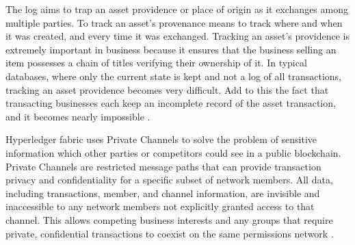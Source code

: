 The log aims to trap an asset providence or place of origin as it exchanges among multiple parties. To track an asset's provenance means to track where and when it was created, and every time it was exchanged. Tracking an asset's providence is extremely important in business because it ensures that the business selling an item possesses a chain of titles verifying their ownership of it. In typical databases, where only the current state is kept and not a log of all transactions, tracking an asset providence becomes very difficult. Add to this the fact that transacting businesses each keep an incomplete record of the asset transaction, and it becomes nearly impossible \cite{blockgeeks2016blockchain}.

Hyperledger fabric uses Private Channels to solve the problem of sensitive information which other parties or competitors could see in a public blockchain. Private Channels are restricted message paths that can provide transaction privacy and confidentiality for a specific subset of network members. All data, including transactions, member, and channel information, are invisible and inaccessible to any network members not explicitly granted access to that channel. This allows competing business interests and any groups that require private, confidential transactions to coexist on the same permissions network \cite{brabbani2017hashing}.
